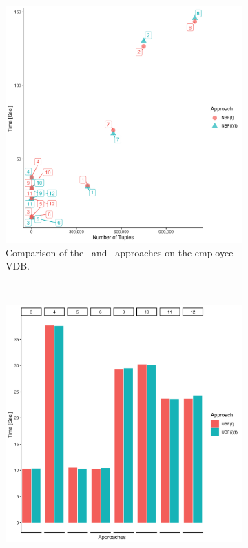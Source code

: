 \begin{figure}[t!]
\begin{subfigure}[t]{0.5\textwidth}
        \includegraphics[scale=0.06]{figs/plots/emp-nbf-f-scatter.png}
        \caption[Comparison of the \nbff\ and \nbfif\ approaches on the employee VDB]{Comparison of the \nbff\ and \nbfif\ approaches on the employee VDB.}
    \end{subfigure}\\[1 ex]
    \begin{subfigure}[t]{0.5\textwidth}
        \centering
        \includegraphics[scale=0.06]{figs/plots/emp-ubf-f.png}

\end{subfigure}
\end{figure}
